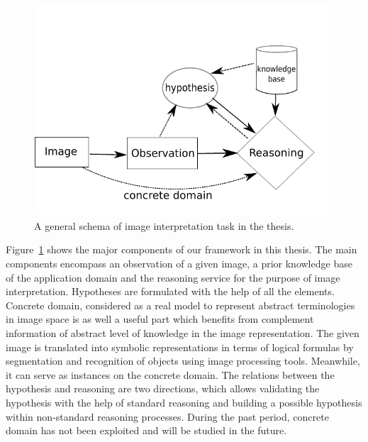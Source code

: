 \documentclass{article}
\begin{document}
  \begin{figure}[h]
  \centering
   \includegraphics[scale=.8]{./figures/intro_schema.pdf}
   \caption{\label{fig:intro_schema} A general schema of image interpretation task in the thesis.}
 \end{figure} 
Figure~\ref{fig:intro_schema} shows the major components of our framework in this thesis. 
The main components encompass an observation of a given image, a prior knowledge base of the application domain and the reasoning service for the purpose of image interpretation.
Hypotheses are formulated with the help of all the elements.
Concrete domain, considered as a real model to represent abstract terminologies in image space 
is as well a useful part which benefits from complement information of abstract level of knowledge in the image representation. 
The given image is translated into symbolic representations in terms of logical formulas by segmentation and recognition of objects using image processing tools.
Meanwhile, it can serve as instances on the concrete domain.
The relations between the hypothesis and reasoning are two directions, which allows validating the hypothesis with the help of standard reasoning and
building a possible hypothesis within non-standard reasoning processes.
During the past period, concrete domain has not been exploited and will be studied in the future.
\end{document}
